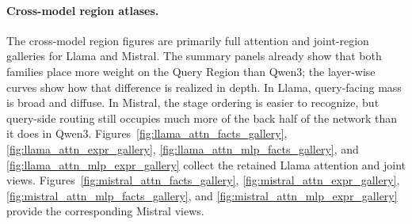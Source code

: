 %
%

\paragraph{Cross-model region atlases.}
The cross-model region figures are primarily full attention and joint-region galleries for Llama and Mistral. The summary panels already show that both families place more weight on the Query Region than Qwen3; the layer-wise curves show how that difference is realized in depth. In Llama, query-facing mass is broad and diffuse. In Mistral, the stage ordering is easier to recognize, but query-side routing still occupies much more of the back half of the network than it does in Qwen3. Figures~\ref{fig:llama_attn_facts_gallery}, \ref{fig:llama_attn_expr_gallery}, \ref{fig:llama_attn_mlp_facts_gallery}, and \ref{fig:llama_attn_mlp_expr_gallery} collect the retained Llama attention and joint views. Figures~\ref{fig:mistral_attn_facts_gallery}, \ref{fig:mistral_attn_expr_gallery}, \ref{fig:mistral_attn_mlp_facts_gallery}, and \ref{fig:mistral_attn_mlp_expr_gallery} provide the corresponding Mistral views.

